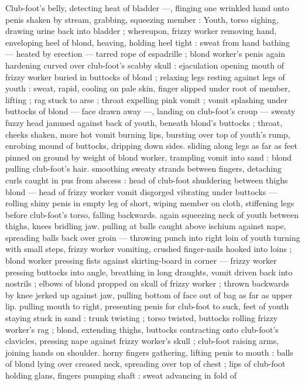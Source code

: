 Club-foot's belly, detecting heat of bladder ---, flinging one wrinkled
hand onto penis shaken by stream, grabbing, squeezing member :
Youth, torso sighing, drawing urine back into bladder ; whereupon,
frizzy worker removing hand, enveloping heel of blond, heaving,
holding heel tight : sweat from hand bathing --- heated by erection
--- tarred rope of espadrille ; blond worker's penis again hardening
curved over club-foot's scabby skull : ejaculation opening mouth of
frizzy worker buried in buttocks of blond ; relaxing legs resting
against legs of youth : sweat, rapid, cooling on pale skin, finger
slipped under root of member, lifting ; rag stuck to arse ; throat
expelling pink vomit ; vomit splashing under buttocks of blond ---
face drawn away ---, landing on club-foot’s croup --- sweaty fuzzy
head jammed against back of youth, beneath blond’s buttocks ;
throat, cheeks shaken, more hot vomit burning lips, bursting over top
of youth's rump, enrobing mound of buttocks, dripping down sides.
sliding along legs as far as feet pinned on ground by weight of blond
worker, trampling vomit into sand : blond pulling club-foot's hair.
smoothing sweaty strands between fingers, detaching curls caught in
pus from abscess : head of club-foot shuddering between thighs
blond --- head of frizzy worker vomit disgorged vibrating under
buttocks --- rolling shiny penis in empty leg of short, wiping member
on cloth, stiffening legs before club-foot's torso, falling backwards.
again squeezing neck of youth between thighs, knees bridling jaw.
pulling at balls caught above ischium against nape, spreading balls
back over groin --- throwing punch into right loin of youth turning
with small steps, frizzy worker vomiting, crushed finger-nails hooked
into loins ; blond worker pressing fists against skirting-board in
corner --- frizzy worker pressing buttocks into angle, breathing in
long draughts, vomit driven back into nostrils ; elbows of blond
propped on skull of frizzy worker ; thrown backwards by knee jerked
up against jaw, pulling bottom of face out of bag as far as upper lip.
pulling mouth to right, presenting penis for club-foot to suck, feet of
youth staying stuck in sand : trunk twisting ; torso twisted, buttocks
rolling frizzy worker's rag ; blond, extending thighs, buttocks
contracting onto club-foot's clavicles, pressing nape against frizzy
worker's skull ; club-foot raising arms, joining hands on shoulder.
horny fingers gathering, lifting penis to mouth : balls of blond lying
over creased neck, spreading over top of chest ; lips of club-foot
holding glans, fingers pumping shaft : sweat advancing in fold of
